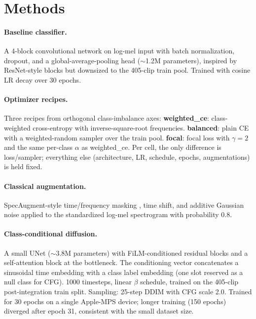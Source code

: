 \documentclass[pmlr,twocolumn,10pt]{jmlr}
\begin{document}
\section{Methods}\label{sec:approach}
\paragraph{Baseline classifier.} A 4-block convolutional network on log-mel input with batch normalization, dropout, and a global-average-pooling head ($\sim$1.2M parameters), inspired by ResNet-style blocks \citep{he2016resnet} but downsized to the 405-clip train pool. Trained with cosine LR decay over 30 epochs.

\paragraph{Optimizer recipes.} Three recipes from orthogonal class-imbalance axes:
\textbf{weighted\_ce}: class-weighted cross-entropy with inverse-square-root frequencies.
\textbf{balanced}: plain CE with a weighted-random sampler over the train pool.
\textbf{focal}: focal loss \citep{lin2017focal} with $\gamma{=}2$ and the same per-class $\alpha$ as weighted\_ce.
Per cell, the only difference is loss/sampler; everything else (architecture, LR, schedule, epochs, augmentations) is held fixed.

\paragraph{Classical augmentation.} SpecAugment-style time/frequency masking \citep{park2019specaugment}, time shift, and additive Gaussian noise applied to the standardized log-mel spectrogram with probability 0.8.

\paragraph{Class-conditional diffusion.} A small UNet ($\sim$3.8M parameters) with FiLM-conditioned \citep{perez2018film} residual blocks and a self-attention block at the bottleneck. The conditioning vector concatenates a sinusoidal time embedding with a class label embedding (one slot reserved as a null class for CFG). 1000 timesteps, linear $\beta$ schedule, trained on the 405-clip post-integration train split. Sampling: 25-step DDIM \citep{song2021ddim} with CFG scale 2.0. Trained for 30 epochs on a single Apple-MPS device; longer training (150 epochs) diverged after epoch 31, consistent with the small dataset size.
\end{document}
